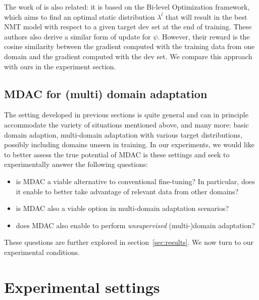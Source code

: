 \documentclass[11pt]{article}
\newcommand{\fyDone}[1]{\done[FY]\Todo[FY:]{\textcolor{orange}{#1}}}
\begin{document}
The work of \cite{Wang20balancing} is also related: it is based on the Bi-level Optimization framework, which aims to find an optimal static distribution $\lambda^{l}$ that will result in the best NMT model with respect to a given target dev set at the end of training. These authors also derive a similar form of update for $\psi$. However, their reward is the cosine similarity between the gradient computed with the training data from one domain and the gradient computed with the dev set. We compare this approach with ours in the experiment section.

\subsection{MDAC for (multi) domain adaptation}
The setting developed in previous sections is quite general and can in principle accommodate the variety of situations mentioned above, and many more: basic domain adaption, multi-domain adaptation with various target distributions, possibly including domains unseen in training. In our experiments, we would like to better assess the true potential of MDAC is these settings and seek to experimentally answer the following questions:
\begin{itemize}
\item is MDAC a viable alternative to conventional fine-tuning? In particular, does it enable to better take advantage of relevant data from other domains?
\item is MDAC also a viable option in multi-domain adaptation scenarios?
\item does MDAC also enable to perform \emph{unsupervised} (multi-)domain adaptation? \fyDone{TBContinued}
\end{itemize}
These questions are further explored in section~\ref{sec:results}. We now turn to our experimental conditions.

\section{Experimental settings} \label{sec:exp}
\end{document}
